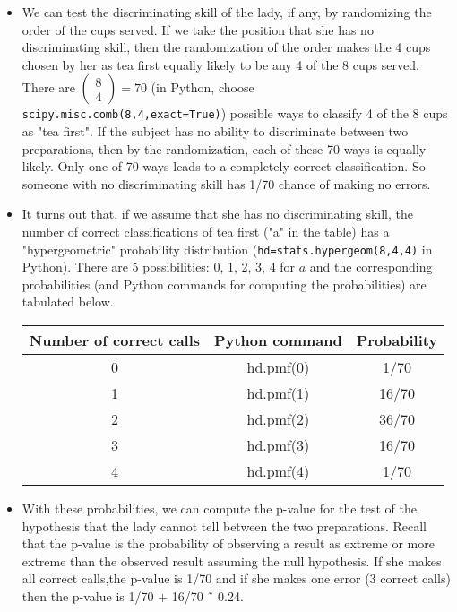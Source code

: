 \begin{itemize}
  \item We can test the discriminating skill of the lady, if any, by randomizing the order of the cups served. If we take the position that she has no discriminating skill, then the randomization of the order makes the 4 cups chosen by her as tea first equally likely to be any 4 of the 8 cups served. There are $\left( {\begin{array}{*{20}{c}}
8\\
4
\end{array}} \right) = 70$ (in Python, choose \lstinline{scipy.misc.comb(8,4,exact=True)}) possible ways to classify 4 of the 8 cups as "tea first". If the subject has no ability to discriminate between two preparations, then by the randomization, each of these 70 ways is equally likely. Only one of 70 ways leads to a completely correct classification. So someone with no discriminating skill has 1/70 chance of making no errors.

  \item It turns out that, if we assume that she has no discriminating skill, the number of correct classifications of tea first ("a" in the table) has a "hypergeometric" probability distribution (\lstinline{hd=stats.hypergeom(8,4,4)} in Python). There are 5 possibilities: 0, 1, 2, 3, 4 for $a$ and the corresponding probabilities (and Python commands for computing the probabilities) are tabulated below.

      \begin{tabular}{c|c|c}
        Number of correct calls & Python command & Probability \\
        \hline
        0 & hd.pmf(0) & 1/70 \\
        1 & hd.pmf(1) & 16/70 \\
        2 & hd.pmf(2) & 36/70 \\
        3 & hd.pmf(3) & 16/70 \\
        4 & hd.pmf(4) & 1/70
      \end{tabular}


  \item With these probabilities, we can compute the p-value for the test of the hypothesis that the lady cannot tell between the two preparations. Recall that the p-value is the probability of observing a result as extreme or more extreme than the observed result assuming the null hypothesis. If she makes all correct calls,the p-value is 1/70 and if she makes one error (3 correct calls) then the p-value is 1/70 + 16/70 ˜ 0.24.

\end{itemize}
  	
